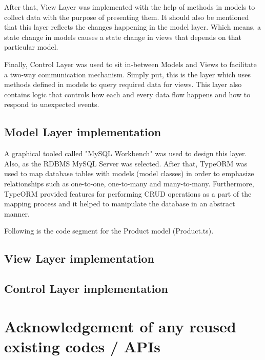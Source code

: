 \documentclass[12pt]{report}
\begin{document}
After that, View Layer was implemented with the help of methods in models to collect data with the purpose of presenting them. It should also be mentioned that this layer reflects the changes happening in the model layer. Which means, a state change in models causes a state change in views that depends on that particular model.

Finally, Control Layer was used to sit in-between Models and Views to facilitate a two-way communication mechanism. Simply put, this is the layer which uses methods defined in models to query required data for views. This layer also contains logic that controls how each and every data flow happens and how to respond to unexpected events.

\subsection{Model Layer implementation}
A graphical tooled called "MySQL Workbench" was used to design this layer. Also, as the RDBMS MySQL Server was selected. After that, TypeORM was used to map database tables with models (model classes) in order to emphasize relationships such as one-to-one, one-to-many and many-to-many. Furthermore, TypeORM provided features for performing CRUD operations as a part of the mapping process and it helped to manipulate the database in an abstract manner.

\noindent
Following is the code segment for the Product model (Product.ts).



\subsection{View Layer implementation}

\subsection{Control Layer implementation}


\section{Acknowledgement of any reused existing codes / APIs}


\newpage
{}
\singlespacing
\printbibliography[title={References}]
\end{document}
